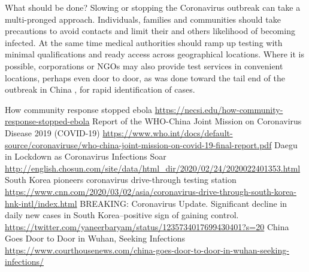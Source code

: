 \documentclass[onecolumn,journal]{IEEEtran}
\begin{document}
\begin{multicols}{2}
What should be done? Slowing or stopping the Coronavirus outbreak can take a multi-pronged approach. Individuals, families and communities should take precautions to avoid contacts and limit their and others likelihood of becoming infected. At the same time medical authorities should ramp up testing with minimal qualifications and ready access across geographical locations. Where it is possible, corporations or NGOs may also provide test services in convenient locations, perhaps even door to door, as was done toward the tail end of the outbreak in China \cite{cdoor}, for rapid identification of cases. 

\end{multicols}

\vspace{2ex}

\begin{thebibliography}{20}

 How community response stopped ebola \url{https://necsi.edu/how-community-response-stopped-ebola}
 Report of the WHO-China Joint Mission on Coronavirus Disease 2019 (COVID-19) \url{https://www.who.int/docs/default-source/coronaviruse/who-china-joint-mission-on-covid-19-final-report.pdf}
 Daegu in Lockdown as Coronavirus Infections Soar \url{http://english.chosun.com/site/data/html_dir/2020/02/24/2020022401353.html}
 South Korea pioneers coronavirus drive-through testing station \url{https://www.cnn.com/2020/03/02/asia/coronavirus-drive-through-south-korea-hnk-intl/index.html}
 BREAKING: Coronavirus Update. Significant decline in daily new cases in South Korea--positive sign of gaining control. \url{https://twitter.com/yaneerbaryam/status/1235734017699430401?s=20}
 China Goes Door to Door in Wuhan, Seeking Infections \url{https://www.courthousenews.com/china-goes-door-to-door-in-wuhan-seeking-infections/}

\end{thebibliography}
\end{document}
